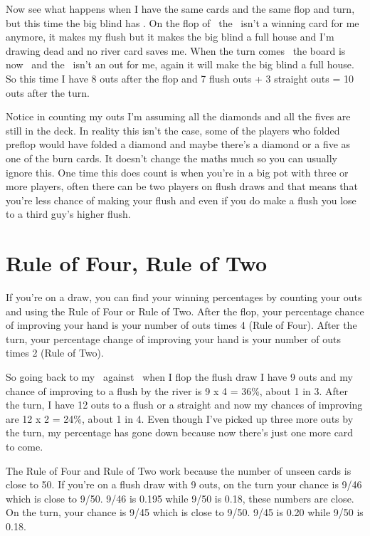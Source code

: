 Now see what happens when I have the same cards and the same flop and
turn, but this time the big blind has \As\Ah. On the flop of
\Ad\tens\eigd\, the \tend\ isn't a winning card for me anymore, it
makes my flush but it makes the big blind a full house and I'm drawing
dead and no river card saves me. When the turn comes \twoc\, the board
is now \Ad\tens\eigd\twoc\ and the \twod\ isn't an out for me, again
it will make the big blind a full house. So this time I have 8 outs
after the flop and 7 flush outs + 3 straight outs = 10 outs after the
turn.

Notice in counting my outs I'm assuming all the diamonds and all the
fives are still in the deck. In reality this isn't the case, some of
the players who folded preflop would have folded a diamond and maybe
there's a diamond or a five as one of the burn cards. It doesn't
change the maths much so you can usually ignore this. One time this
does count is when you're in a big pot with three or more players,
often there can be two players on flush draws and that means that
you're less chance of making your flush and even if you do make a
flush you lose to a third guy's higher flush.

\section{Rule of Four, Rule of Two}

If you're on a draw, you can find your winning percentages by counting
your outs and using the Rule of Four or Rule of Two. After the flop,
your percentage chance of improving your hand is your number of outs
times 4 (Rule of Four). After the turn, your percentage change of
improving your hand is your number of outs times 2 (Rule of Two).

So going back to my \fourd\tred\ against \As\Js\, when I flop the
flush draw I have 9 outs and my chance of improving to a flush by the
river is 9 x 4 = 36\%, about 1 in 3. After the turn, I have 12 outs to
a flush or a straight and now my chances of improving are 12 x 2 =
24\%, about 1 in 4. Even though I've picked up three more outs by the
turn, my percentage has gone down because now there's just one more
card to come.

The Rule of Four and Rule of Two work because the number of unseen
cards is close to 50. If you're on a flush draw with 9 outs, on the
turn your chance is 9/46 which is close to 9/50. 9/46 is 0.195 while
9/50 is 0.18, these numbers are close. On the turn, your chance is
9/45 which is close to 9/50. 9/45 is 0.20 while 9/50 is 0.18.

